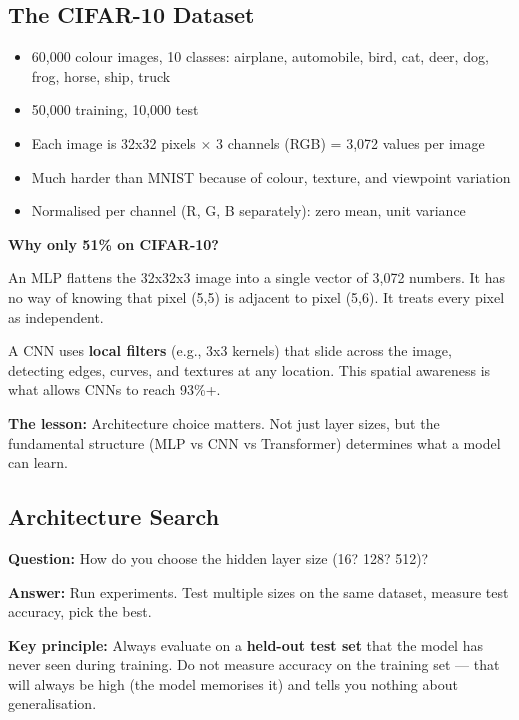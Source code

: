 \documentclass[12pt, a4paper]{article}
\begin{document}
\subsection{The CIFAR-10 Dataset}

\begin{itemize}
  \item 60,000 colour images, 10 classes: airplane, automobile, bird, cat, deer, dog, frog, horse, ship, truck
  \item 50,000 training, 10,000 test
  \item Each image is 32x32 pixels $\times$ 3 channels (RGB) = 3,072 values per image
  \item Much harder than MNIST because of colour, texture, and viewpoint variation
  \item Normalised per channel (R, G, B separately): zero mean, unit variance
\end{itemize}

\textbf{Why only 51\% on CIFAR-10?}

An MLP flattens the 32x32x3 image into a single vector of 3,072 numbers. It has no way of knowing that pixel (5,5) is adjacent to pixel (5,6). It treats every pixel as independent.

A CNN uses \textbf{local filters} (e.g., 3x3 kernels) that slide across the image, detecting edges, curves, and textures at any location. This spatial awareness is what allows CNNs to reach 93\%+.

\textbf{The lesson:} Architecture choice matters. Not just layer sizes, but the fundamental structure (MLP vs CNN vs Transformer) determines what a model can learn.

\subsection{Architecture Search}

\textbf{Question:} How do you choose the hidden layer size (16? 128? 512)?

\textbf{Answer:} Run experiments. Test multiple sizes on the same dataset, measure test accuracy, pick the best.

\textbf{Key principle:} Always evaluate on a \textbf{held-out test set} that the model has never seen during training. Do not measure accuracy on the training set --- that will always be high (the model memorises it) and tells you nothing about generalisation.
\end{document}
